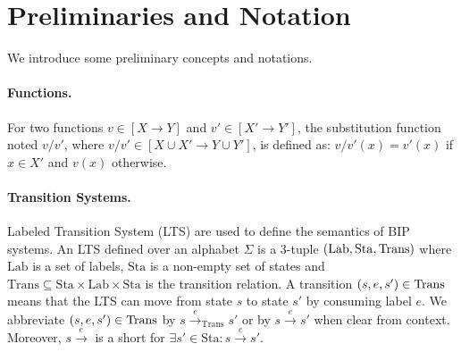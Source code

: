 %
\section{Preliminaries and Notation}
\label{sec:prelim}
%

We introduce some preliminary concepts and notations.
%
\paragraph{Functions.} For two functions $v\in [ X \rightarrow Y]$ and $v'\in [X' \rightarrow Y']$, the substitution function noted $v/v'$, where $v/v' \in [X \cup X' \rightarrow Y \cup Y']$, is defined as: $v/v'(x) = v'(x)$ if $x \in X'$ and $v(x)$ otherwise.
%



\paragraph{Transition Systems.}
%
Labeled Transition System (LTS) are used to define the semantics of BIP systems.
An LTS defined over an alphabet $\Sigma$ is a 3-tuple $(\mathrm{Lab},\mathrm{Sta},\mathrm{Trans})$ where $\mathrm{Lab}$ is a set of labels, $\mathrm{Sta}$ is a non-empty set of states and $\mathrm{Trans}\subseteq \mathrm{Sta}\times \mathrm{Lab} \times \mathrm{Sta}$ is the transition relation.
A transition $(s,e,s')\in\mathrm{Trans}$ means that the LTS can move from state $s$ to state $s'$ by consuming label $e$.
We abbreviate $(s,e,s')\in\mathrm{Trans}$ by $s \stackrel{e}{\rightarrow}_\mathrm{Trans} s'$ or by $s\stackrel{e}{\rightarrow} s'$ when clear from context.
Moreover, $s \stackrel{e}{\rightarrow}$ is a short for $\exists s'\in\mathrm{Sta}: s\stackrel{e}{\rightarrow} s'$.
%
%
%
%



